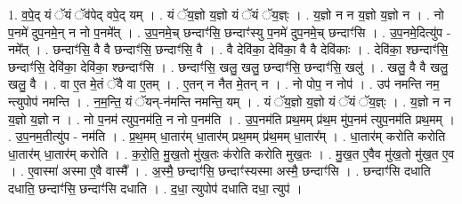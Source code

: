 \documentclass[17pt]{extarticle}
\begin{document}
1. व॒पे॒द् यं ॅयं ॅव॑पेद् वपे॒द् यम् । . यं ॅय॒ज्ञो य॒ज्ञो यं ॅयं ॅय॒ज्ञ्ः । . य॒ज्ञो न न य॒ज्ञो य॒ज्ञो न । . नो प॒नमे॑ दुप॒नमे॒न् न नो प॒नमे᳚त् । . उ॒प॒नमे॒च् छन्दाꣳ॑सि॒ छन्दाꣳ॑स्यु प॒नमे॑ दुप॒नमे॒च् छन्दाꣳ॑सि । . उ॒प॒नमे॒दित्यु॑प - नमे᳚त् । . छन्दाꣳ॑सि॒ वै वै छन्दाꣳ॑सि॒ छन्दाꣳ॑सि॒ वै । . वै देवि॑का॒ देवि॑का॒ वै वै देवि॑काः । . देवि॑का॒ श्छन्दाꣳ॑सि॒ छन्दाꣳ॑सि॒ देवि॑का॒ देवि॑का॒ श्छन्दाꣳ॑सि । . छन्दाꣳ॑सि॒ खलु॒ खलु॒ छन्दाꣳ॑सि॒ छन्दाꣳ॑सि॒ खलु॑ । . खलु॒ वै वै खलु॒ खलु॒ वै । . वा ए॒त मे॒तं ॅवै वा ए॒तम् । . ए॒तन् न नैत मे॒तन् न । . नो पोप॒ न नोप॑ । . उप॑ नमन्ति नम॒ न्त्युपोप॑ नमन्ति । . न॒म॒न्ति॒ यं ॅयन्-न॑मन्ति नमन्ति॒ यम् । . यं ॅय॒ज्ञो य॒ज्ञो यं ॅयं ॅय॒ज्ञ्ः । . य॒ज्ञो न न य॒ज्ञो य॒ज्ञो न । . नो प॒नम॑ त्युप॒नम॑ति॒ न नो प॒नम॑ति । . उ॒प॒नम॑ति प्रथ॒मम् प्र॑थ॒म मु॑प॒नम॑ त्युप॒नम॑ति प्रथ॒मम् । . उ॒प॒नम॒तीत्यु॑प - नम॑ति । . प्र॒थ॒मम् धा॒तार॑म् धा॒तार॑म् प्रथ॒मम् प्र॑थ॒मम् धा॒तार᳚म् । . धा॒तार॑म् करोति करोति धा॒तार॑म् धा॒तार॑म् करोति । . क॒रो॒ति॒ मु॒ख॒तो मु॑ख॒तः क॑रोति करोति मुख॒तः । . मु॒ख॒त ए॒वैव मु॑ख॒तो मु॑ख॒त ए॒व । . ए॒वास्मा॑ अस्मा ए॒वै वास्मै᳚ । . अ॒स्मै॒ छन्दाꣳ॑सि॒ छन्दाꣳ॑स्यस्मा अस्मै॒ छन्दाꣳ॑सि । . छन्दाꣳ॑सि दधाति दधाति॒ छन्दाꣳ॑सि॒ छन्दाꣳ॑सि दधाति । . द॒धा॒ त्युपोप॑ दधाति दधा॒ त्युप॑ । \newline
\end{document}
